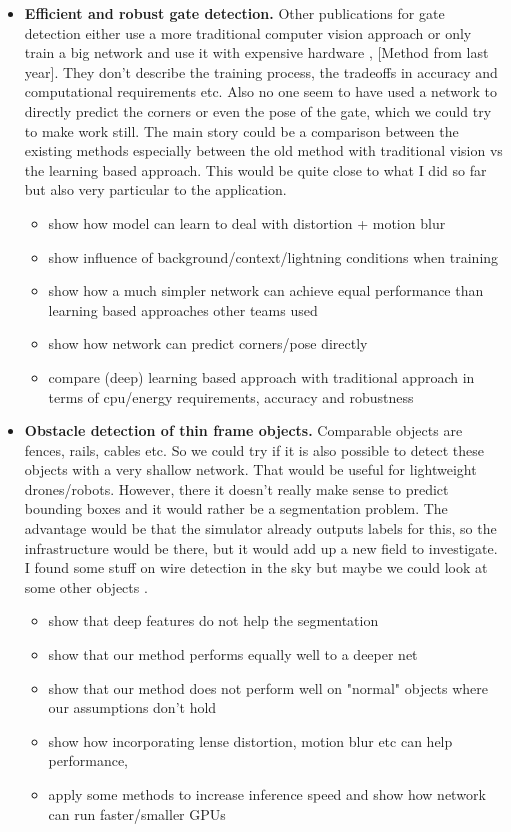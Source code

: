 \documentclass{article}
\begin{document}
\begin{itemize}
\begin{itemize}
	\item \textbf{Efficient and robust gate detection.} Other publications for gate detection either use a more traditional computer vision approach  or only train a big network and use it with expensive hardware \cite{Falanga, Jung, Jung2018}, [Method from last year]. They don't describe the training process, the tradeoffs in accuracy and computational requirements etc. Also no one seem to have used a network to directly predict the corners or even the pose of the gate, which we could try to make work still. The main story could be a comparison between the existing methods especially between the old method with traditional vision vs the learning based approach. This would be quite close to what I did so far but also very particular to the application.
\begin{itemize}
	\item show how model can learn to deal with distortion + motion blur
	\item show influence of background/context/lightning conditions when training
	\item show how a much simpler network can achieve equal performance than learning based approaches other teams used \cite{Jung}
	\item show how network can predict corners/pose directly
	\item compare (deep) learning based approach with traditional approach in terms of cpu/energy requirements, accuracy and robustness
\end{itemize}
	
	\item \textbf{Obstacle detection of thin frame objects.} Comparable objects are fences, rails, cables etc. So we could try if it is also possible to detect these objects with a very shallow network. That would be useful for lightweight drones/robots. However, there it doesn't really make sense to predict bounding boxes and it would rather be a segmentation problem. The advantage would be that the simulator already outputs labels for this, so the infrastructure would be there, but it would add up a new field to investigate.	
	I found some stuff on wire detection in the sky but maybe we could look at some other objects \cite{8206190, 8014779}.
	\begin{itemize}
		\item show that deep features do not help the segmentation
		\item show that our method performs equally well to a deeper net
		\item show that our method does not perform well on "normal" objects where our assumptions don't hold
		\item show how incorporating lense distortion, motion blur etc can help performance,
		\item apply some methods to increase inference speed and show how network can run faster/smaller GPUs
	\end{itemize}
	

\end{itemize}
\end{itemize}
\end{document}
